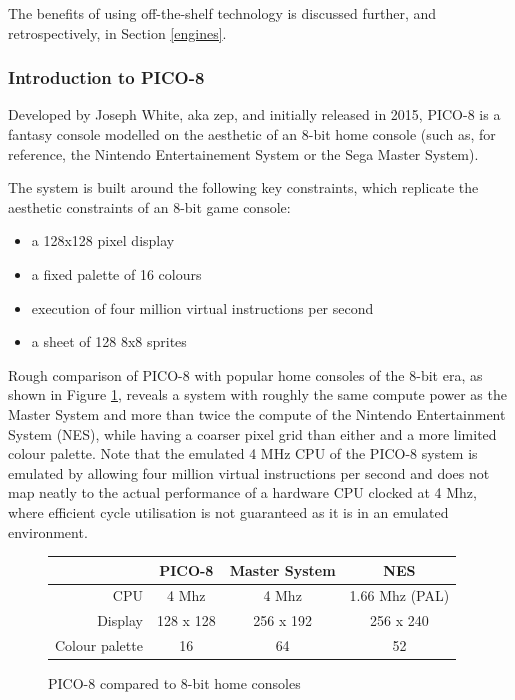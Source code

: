 \documentclass[11pt]{article}
\begin{document}
The benefits of using off-the-shelf technology is discussed further, and retrospectively, in
Section \ref{engines}.

\subsubsection*{Introduction to PICO-8}

Developed by Joseph White, aka zep, and initially released in 2015, PICO-8 is a 
fantasy console modelled on the aesthetic of an 8-bit home console (such as,
for reference, the Nintendo Entertainement System or the Sega Master System).

The system is built around the following key constraints\cite{white}, which replicate
the aesthetic constraints of an 8-bit game console:

\begin{itemize}
   \item a 128x128 pixel display
   \item a fixed palette of 16 colours
   \item execution of four million virtual instructions per second
   \item a sheet of 128 8x8 sprites
\end{itemize}


Rough comparison of PICO-8 with popular home consoles of the 8-bit era, as
shown in Figure \ref{fig:consolecomparison}, reveals a system with roughly the same
compute power as the Master System and more than twice the compute of the Nintendo
Entertainment System (NES), while having a coarser pixel grid than either and
a more limited colour palette. Note that the emulated 4 MHz CPU of the PICO-8 system
is emulated by allowing four million virtual instructions per second and does not
map neatly to the actual performance of a hardware CPU clocked at 4 Mhz, where efficient
cycle utilisation is not guaranteed as it is in an emulated environment.

\begin{figure}[h]
\begin{center}
\begin{tabular}{r|c|c|c}
      & PICO-8 & Master System\cite{mastersystem} & NES\cite{nes} \\
     \hline
     CPU & 4 Mhz & 4 Mhz & 1.66 Mhz (PAL) \\
     Display & 128 x 128 & 256 x 192 & 256 x 240 \\
     Colour palette & 16 & 64 & 52 \\
\end{tabular}
\end{center}
\caption{PICO-8 compared to 8-bit home consoles}
\label{fig:consolecomparison}
\end{figure}
\end{document}
